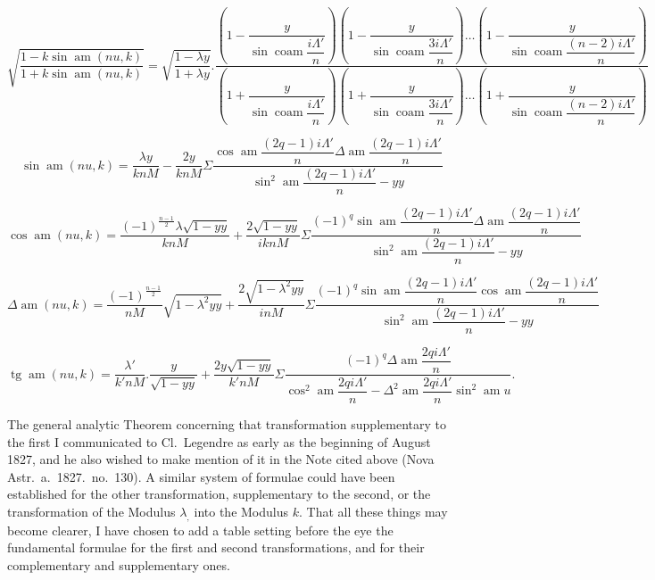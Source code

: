 \documentclass{article}
\begin{document}
\[
\sqrt{\frac{1-k\sin\operatorname{am}(nu,k)}{1+k\sin\operatorname{am}(nu,k)}}=\sqrt{\frac{1-\lambda y}{1+\lambda y}}.\frac{\left(1-\dfrac{y}{\sin\operatorname{coam}\dfrac{i\Lambda'}{n}}\right)\left(1-\dfrac{y}{\sin\operatorname{coam}\dfrac{3i\Lambda'}{n}}\right)\ldots\left(1-\dfrac{y}{\sin\operatorname{coam}\dfrac{(n-2)i\Lambda'}{n}}\right)}{\left(1+\dfrac{y}{\sin\operatorname{coam}\dfrac{i\Lambda'}{n}}\right)\left(1+\dfrac{y}{\sin\operatorname{coam}\dfrac{3i\Lambda'}{n}}\right)\ldots\left(1+\dfrac{y}{\sin\operatorname{coam}\dfrac{(n-2)i\Lambda'}{n}}\right)}
\]

\[
\sin\operatorname{am}(nu,k)=\frac{\lambda y}{knM}-\frac{2y}{knM}\Sigma\frac{\cos\operatorname{am}\dfrac{(2q-1)i\Lambda'}{n}\Delta\operatorname{am}\dfrac{(2q-1)i\Lambda'}{n}}{\sin^{2}\operatorname{am}\dfrac{(2q-1)i\Lambda'}{n}-yy}
\]

\[
\cos\operatorname{am}(nu,k)=\frac{(-1)^{\frac{n-1}{2}}\lambda\sqrt{1-yy}}{knM}+\frac{2\sqrt{1-yy}}{iknM}\Sigma\frac{(-1)^{q}\sin\operatorname{am}\dfrac{(2q-1)i\Lambda'}{n}\Delta\operatorname{am}\dfrac{(2q-1)i\Lambda'}{n}}{\sin^{2}\operatorname{am}\dfrac{(2q-1)i\Lambda'}{n}-yy}
\]

\[
\Delta\operatorname{am}(nu,k)=\frac{(-1)^{\frac{n-1}{2}}}{nM}\sqrt{1-\lambda^{2}yy}+\frac{2\sqrt{1-\lambda^{2}yy}}{inM}\Sigma\frac{(-1)^{q}\sin\operatorname{am}\dfrac{(2q-1)i\Lambda'}{n}\cos\operatorname{am}\dfrac{(2q-1)i\Lambda'}{n}}{\sin^{2}\operatorname{am}\dfrac{(2q-1)i\Lambda'}{n}-yy}
\]

\[
\operatorname{tg}\operatorname{am}(nu,k)=\frac{\lambda'}{k'nM}.\frac{y}{\sqrt{1-yy}}+\frac{2y\sqrt{1-yy}}{k'nM}\Sigma\frac{(-1)^{q}\Delta\operatorname{am}\dfrac{2qi\Lambda'}{n}}{\cos^{2}\operatorname{am}\dfrac{2qi\Lambda'}{n}-\Delta^{2}\operatorname{am}\dfrac{2qi\Lambda'}{n}\sin^{2}\operatorname{am}u}.
\]

The general analytic Theorem concerning that transformation supplementary to the first I communicated to Cl.\ Legendre as early as the beginning of August 1827, and he also wished to make mention of it in the Note cited above (Nova Astr.\ a.\ 1827.\ no.\ 130). A similar system of formulae could have been established for the other transformation, supplementary to the second, or the transformation of the Modulus $\lambda_{,}$ into the Modulus $k$. That all these things may become clearer, I have chosen to add a table setting before the eye the fundamental formulae for the first and second transformations, and for their complementary and supplementary ones.
\end{document}
